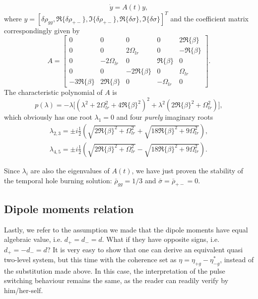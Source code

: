 \documentclass[onecolumn,secnumarabic,amssymb, nobibnotes, aip, prd]{revtex4-1}
\begin{document}
\begin{appendices}
\begin{equation}
\dot{y} = A(t)y,
\end{equation}
where $y =[\delta\rho_{gg},\Re\{\delta\rho_{+-}\},\Im\{\delta\rho_{+-}\},\Re\{\delta\sigma\},\Im\{\delta\sigma\}]^T$ and the coefficient matrix correspondingly given by
\begin{equation}
A = \begin{bmatrix} 0 & 0 & 0 & 0 & 2\Re\{\beta\} \\
0  & 0 & 2\Omega_{lr} & 0 & -\Re\{\beta\} \\
0 & -2\Omega_{lr} & 0 & \Re\{\beta\} & 0 \\
0 & 0 & -2\Re\{\beta\} & 0 & \Omega_{lr} \\
-3\Re\{\beta\} & 2\Re\{\beta\} & 0 & -\Omega_{lr} & 0  
\end{bmatrix}.
\end{equation} 
The characteristic polynomial of $A$ is 
\begin{equation}
p(\lambda) = -\lambda\big[ (\lambda^2+2\Omega_{lr}^2+4\Re\{\beta\}^2 )^2+\lambda^2(2\Re\{\beta\}^2+\Omega_{lr}^2)\big],
\end{equation} which obviously has one root $\lambda_{1} =0 $ and four \emph{purely} imaginary roots 
\begin{subequations}
	\label{eq:eigenvalues}
	\begin{align}
	\lambda_{2,3} = \pm i\frac{1}{2}\left(\sqrt{2\Re\{\beta\}^2+\Omega_{lr}^2} + \sqrt{18\Re\{\beta\}^2+9\Omega_{lr}^2} \right),  \\
	\lambda_{4,5} =  \pm i\frac{1}{2}\left(\sqrt{2\Re\{\beta\}^2+\Omega_{lr}^2} - \sqrt{18\Re\{\beta\}^2+9\Omega_{lr}^2} \right). 
	\end{align}
\end{subequations}

Since $\lambda_i$ are also the eigenvalues of $A(t)$, we have just proven the stability of the temporal hole burning solution: $\bar\rho_{gg} = 1/3$ and $\bar\sigma = \bar\rho_{+-}=0$. 

\subsection{Dipole moments relation}
\label{sec:sup-dipole}
Lastly, we refer to the assumption we made that the dipole moments have equal algebraic value, i.e. $d_{+} = d_{-} = d$. What if they have opposite signs, i.e. $d_{+} = -d_{-} = d$? It is very easy to show that one can derive an equivalent quasi two-level system, but this time with the coherence set as $\eta = \eta_{+g}-\eta_{-g}^*$, instead of the substitution made above. In this case, the interpretation of the pulse switching behaviour remains the same, as the reader can readily verify by him/her-self.
\end{appendices}

	

\end{document}
